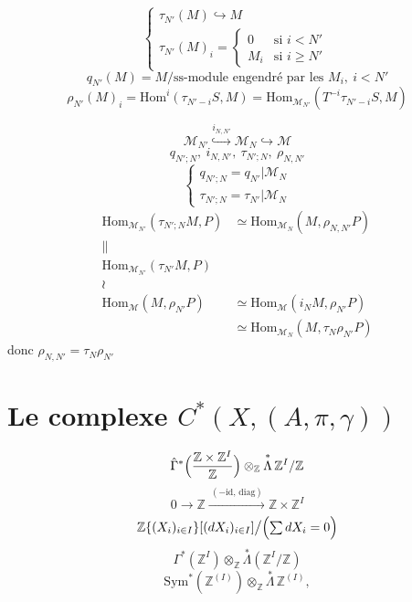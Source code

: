\documentclass[11pt,a4paper]{article}
\begin{document}
\[
  \left\{
  \begin{array}{l}
    \tau_{N'}(M) \hookrightarrow M \\
    \tau_{N'}(M)_i = \begin{cases} 0 & \text{si } i < N' \\ M_i & \text{si } i \geq N' \end{cases}
  \end{array}
  \right.
\]
\[
  q_{N'}(M) = M/\text{ss-module engendré par les } M_i,\ i < N'
\]
\[
  \rho_{N'}(M)_i = \mathrm{Hom}^i(\tau_{N'-i}S, M) = \mathrm{Hom}_{\mathcal{M}_{N'}}(T^{-i}\tau_{N'-i}S, M)
\]

\[
  \mathcal{M}_{N'} \overset{i_{N,N'}}{\hookrightarrow} \mathcal{M}_N \hookrightarrow \mathcal{M}
\]
\[
  q_{N';N},\ i_{N,N'},\ \tau_{N';N},\ \rho_{N,N'}
\]
\[
  \left\{
  \begin{array}{l}
    q_{N';N} = q_{N'} | \mathcal{M}_N \\
    \tau_{N';N} = \tau_{N'} | \mathcal{M}_N
  \end{array}
  \right.
\]
\begin{align*}
  \mathrm{Hom}_{\mathcal{M}_{N'}}(\tau_{N';N} M, P) &\simeq \mathrm{Hom}_{\mathcal{M}_N}(M, \rho_{N,N'} P) \\
  \| \qquad & \\
  \mathrm{Hom}_{\mathcal{M}_{N'}}(\tau_{N'} M, P) & \\
  \wr \qquad & \\
  \mathrm{Hom}_{\mathcal{M}}(M, \rho_{N'} P) &\simeq \mathrm{Hom}_{\mathcal{M}}(i_N M, \rho_{N'} P) \\
  &\simeq \mathrm{Hom}_{\mathcal{M}_N}(M, \tau_N \rho_{N'} P)
\end{align*}
donc \quad $\boxed{\rho_{N,N'} = \tau_N \rho_{N'}}$

\section{Le complexe $C^*(X, (A, \pi, \gamma))$}

\[
  \hat{\Gamma}^*\Bigl(\frac{\mathbb{Z} \times \mathbb{Z}^I}{\mathbb{Z}}\Bigr) \otimes_{\mathbb{Z}} \overset{*}{\Lambda}\, \mathbb{Z}^I/\mathbb{Z}
\]
\[
  0 \longrightarrow \mathbb{Z} \xrightarrow{\ (-\mathrm{id},\, \mathrm{diag})\ } \mathbb{Z} \times \mathbb{Z}^I
\]
\[
  \mathbb{Z}\{(X_i)_{i \in I}\}[(dX_i)_{i \in I}]\big/\Bigl(\textstyle\sum dX_i = 0\Bigr)
\]
\[
  \Gamma^*(\mathbb{Z}^I) \otimes_{\mathbb{Z}} \overset{*}{\Lambda}(\mathbb{Z}^I/\mathbb{Z})
\]
\[
  \mathrm{Sym}^*(\mathbb{Z}^{(I)}) \otimes_{\mathbb{Z}} \overset{*}{\Lambda}\, \mathbb{Z}^{(I)},
\]
\end{document}
